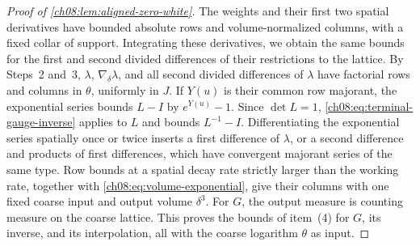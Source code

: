 \begin{proof}[Proof of \cref{ch08:lem:aligned-zero-white}]
The weights and their first two spatial derivatives have bounded absolute rows and volume-normalized columns, with a fixed collar of support. Integrating these derivatives, we obtain the same bounds for the first and second divided differences of their restrictions to the lattice. By Steps~2 and~3, $\lambda$, $\nabla_\delta\lambda$, and all second divided differences of $\lambda$ have factorial rows and columns in $\theta$, uniformly in $J$. If $Y(u)$ is their common row majorant, the exponential series bounds $L-I$ by $e^{Y(u)}-1$. Since $\det L=1$, \eqref{ch08:eq:terminal-gauge-inverse} applies to $L$ and bounds $L^{-1}-I$. Differentiating the exponential series spatially once or twice inserts a first difference of $\lambda$, or a second difference and products of first differences, which have convergent majorant series of the same type. Row bounds at a spatial decay rate strictly larger than the working rate, together with \eqref{ch08:eq:volume-exponential}, give their columns with one fixed coarse input and output volume $\delta^3$. For $G$, the output measure is counting measure on the coarse lattice. This proves the bounds of item~(4) for $G$, its inverse, and its interpolation, all with the coarse logarithm $\theta$ as input.


\end{proof}
